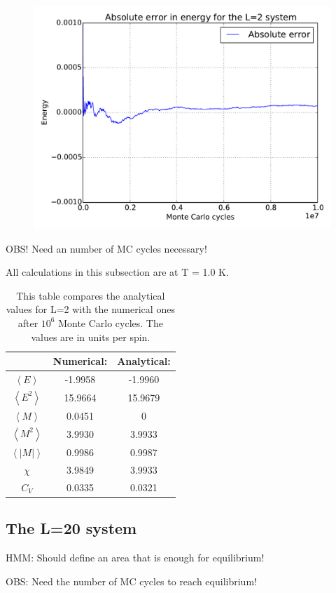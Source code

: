 \begin{figure}[H]
	\centering
	\includegraphics[width=0.7\linewidth]{../results/4b/abs_error}
	\caption{}
	\label{fig:abserror}
\end{figure}

OBS! Need an number of MC cycles necessary!

All calculations in this subsection are at T = 1.0 K. 

\begin{table}\caption{This table compares the analytical values for L=2 with the numerical ones after $10^6$ Monte Carlo cycles. The values are in units per spin.}\label{tab:compare_values}
	\begin{tabular}{ccc}
		& Numerical: & Analytical:\\ \hline
		$\left<E\right>$ &   -1.9958 & -1.9960\\
		$\left<E^2\right>$ &   15.9664 & 15.9679\\
		$\left<M\right>$ &    0.0451 & 0\\
		$\left<M^2\right>$ &    3.9930 & 3.9933\\
		$\left<|M|\right>$ &    0.9986 & 0.9987\\
		$\chi$ &   3.9849 & 3.9933\\
		$C_V$& 0.0335 & 0.0321\\
	\end{tabular}
\end{table}


\subsection{The L=20 system}

HMM: Should define an area that is enough for equilibrium!

OBS: Need the number of MC cycles to reach equilibrium!

